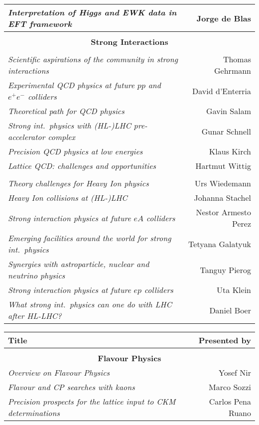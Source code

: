 \begin{flushleft}
\begin{tabular}{lr}
\it Interpretation of Higgs and EWK data in EFT framework & Jorge de Blas \\ \hline 
\vspace*{-3mm} & \\
\multicolumn{2}{c}{\bf Strong Interactions} \\
\vspace*{-3mm} & \\
\it Scientific aspirations of the community in strong interactions & Thomas Gehrmann \\
\it Experimental QCD physics at future $pp$ and $e^+e^-$ colliders & David d'Enterria \\
\it Theoretical path for QCD physics & Gavin Salam \\
\it Strong int.\ physics with (HL-)LHC pre-accelerator complex & Gunar Schnell \\
\it Precision QCD physics at low energies & Klaus Kirch \\
\it Lattice QCD: challenges and opportunities & Hartmut Wittig \\ 
\vspace*{-3mm} & \\
\it Theory challenges for Heavy Ion physics & Urs Wiedemann \\
\it Heavy Ion collisions at (HL-)LHC & Johanna Stachel \\
\it Strong interaction physics at future $eA$ colliders & \quad Nestor Armesto Perez \\
\it Emerging facilities around the world for strong int.\ physics & Tetyana Galatyuk \\
\it Synergies with astroparticle, nuclear and neutrino physics & Tanguy Pierog \\
\it Strong interaction physics at future $ep$ colliders & Uta Klein \\
\it What strong int.\ physics can one do with LHC after HL-LHC? & Daniel Boer \\ \hline 
\end{tabular}
\vfill \newpage
\begin{tabular}{lr}
\bf Title & \bf Presented by \\ \hline 
\vspace*{-3mm} & \\
\multicolumn{2}{c}{\bf Flavour Physics} \\
\it Overview on Flavour Physics & Yosef Nir \\
\it Flavour and CP searches with kaons & Marco Sozzi \\
\it Precision prospects for the lattice input to CKM determinations & Carlos Pena Ruano \\

\end{tabular}
\end{flushleft}
